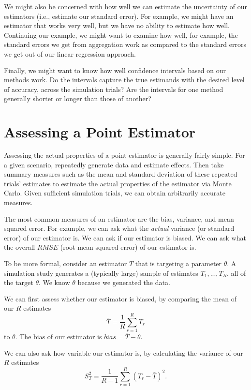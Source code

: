 \documentclass[
]{book}
\begin{document}
We might also be concerned with how well we can estimate the uncertainty of our estimators (i.e., estimate our standard error).
For example, we might have an estimator that works very well, but we have no ability to estimate how well.
Continuing our example, we might want to examine how well, for example, the standard errors we get from aggregation work as compared to the standard errors we get out of our linear regression approach.

Finally, we might want to know how well confidence intervals based on our methods work.
Do the intervals capture the true estimands with the desired level of accuracy, across the simulation trials?
Are the intervals for one method generally shorter or longer than those of another?

\section{Assessing a Point Estimator}\label{assessing-a-point-estimator}

Assessing the actual properties of a point estimator is generally fairly simple.
For a given scenario, repeatedly generate data and estimate effects.
Then take summary measures such as the mean and standard deviation of these repeated trials' estimates to estimate the actual properties of the estimator via Monte Carlo.
Given sufficient simulation trials, we can obtain arbitrarily accurate measures.

The most common measures of an estimator are the bias, variance, and mean squared error.
For example, we can ask what the \emph{actual} variance (or standard error) of our estimator is.
We can ask if our estimator is biased.
We can ask what the overall \(RMSE\) (root mean squared error) of our estimator is.

To be more formal, consider an estimator \(T\) that is targeting a parameter \(\theta\).
A simulation study generates a (typically large) sample of estimates \(T_1,...,T_R\), all of the target \(\theta\).
We know \(\theta\) because we generated the data.

We can first assess whether our estimator is biased, by comparing the mean of our \(R\) estimates
\[ \bar{T} = \frac{1}{R}\sum_{r=1}^R T_r \]
to \(\theta\).
The bias of our estimator is \(bias = \bar{T} - \theta\).

We can also ask how variable our estimator is, by calculating the variance of our \(R\) estimates
\[\displaystyle{S_T^2 = \frac{1}{R - 1}\sum_{r=1}^R \left(T_r - \bar{T}\right)^2} . \]
\end{document}
